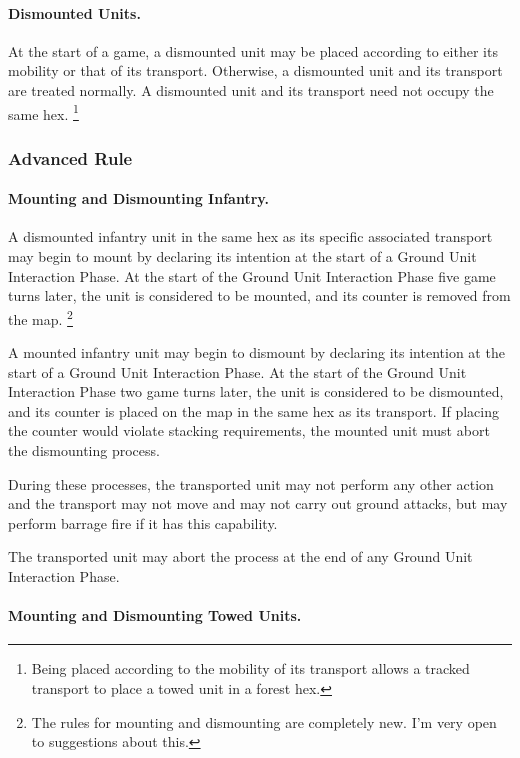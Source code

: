 \documentclass[10pt]{article}
\newcommand{\note}[1]{%
    \footnote{%
        \setlength{\parindent}{0pt}%
        \setlength{\parskip}{\smallskipamount}%
        #1
    }%
}
\begin{document}
\paragraph{Dismounted Units.}

At the start of a game, a dismounted unit may be placed according to either its mobility or that of its transport.
Otherwise, a dismounted unit and its transport are treated normally.
A dismounted unit and its transport need not occupy the same hex.%
\note{
    Being placed according to the mobility of its transport allows a tracked transport to place a towed unit in a forest hex.
}

\subsubsection{Advanced Rule}

\paragraph{Mounting and Dismounting Infantry.}

A dismounted infantry unit in the same hex as its specific associated transport may begin to mount by declaring its intention at the start of a Ground Unit Interaction Phase.
At the start of the Ground Unit Interaction Phase five game turns later, the unit is considered to be mounted, and its counter is removed from the map.%
\note{
    The rules for mounting and dismounting are completely new. I'm very open to suggestions about this.
}

A mounted infantry unit may begin to dismount by declaring its intention at the start of a Ground Unit Interaction Phase.
At the start of the Ground Unit Interaction Phase two game turns later, the unit is considered to be dismounted, and its counter is placed on the map in the same hex as its transport. If placing the counter would violate stacking requirements, the mounted unit must abort the dismounting process.

During these processes, the transported unit may not perform any other action and the transport may not move and may not carry out ground attacks, but may perform barrage fire if it has this capability.

The transported unit may abort the process at the end of any Ground Unit Interaction Phase.

\paragraph{Mounting and Dismounting Towed Units.}
\end{document}

